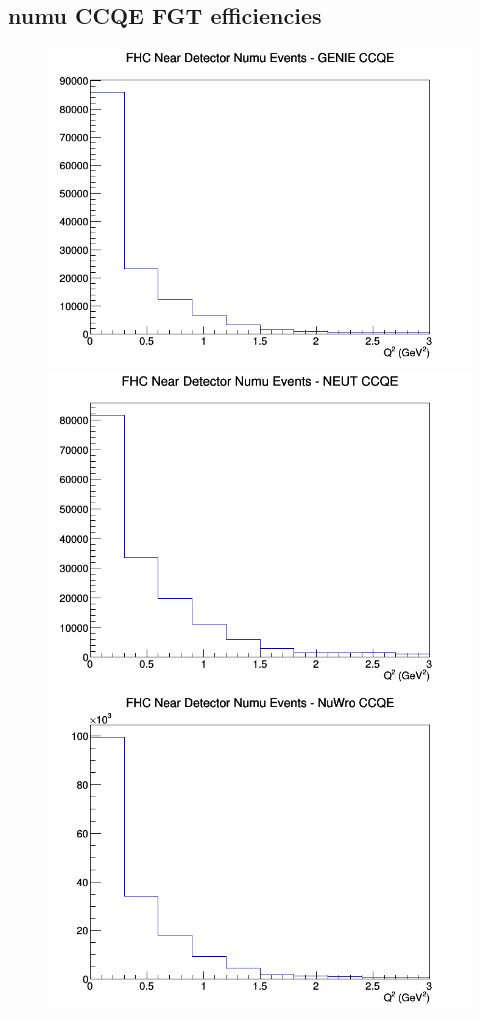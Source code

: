 \documentclass[12pt]{article}
\begin{document}
\subsection{numu CCQE FGT efficiencies}
\begin{figure}[h]
\includegraphics[width=\linewidth]{eff_Q2/FGT/CCQE_FHC_ND_numu_Q2_GENIE.png}
\endminipage
{}
\includegraphics[width=\linewidth]{eff_Q2/FGT/CCQE_FHC_ND_numu_Q2_NEUT.png}
\endminipage
{}
\includegraphics[width=\linewidth]{eff_Q2/FGT/CCQE_FHC_ND_numu_Q2_NuWro.png}

\end{figure}
\end{document}
